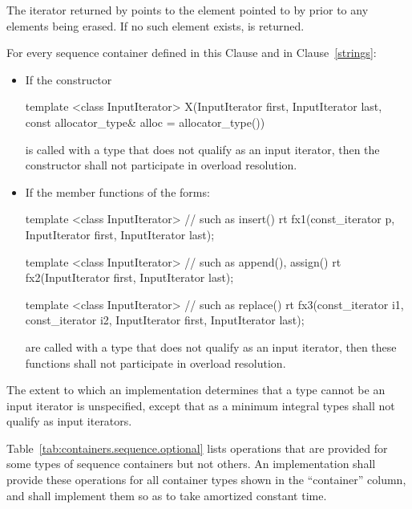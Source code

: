 \pnum
The iterator returned by
points to the element pointed to by
prior to any elements being erased.
If no such element exists,
is returned.

\pnum
For every sequence container defined in this Clause and in Clause~\ref{strings}:

\begin{itemize}
\item If the constructor

\begin{codeblock}
template <class InputIterator>
X(InputIterator first, InputIterator last,
  const allocator_type& alloc = allocator_type())
\end{codeblock}

is called with a type  that does not qualify as an input
iterator, then the constructor
shall not participate in overload resolution.

\item If the member functions of the forms:

\begin{codeblock}
template <class InputIterator>          // such as insert()
  rt fx1(const_iterator p, InputIterator first, InputIterator last);

template <class InputIterator>          // such as append(), assign()
  rt fx2(InputIterator first, InputIterator last);

template <class InputIterator>          // such as replace()
  rt fx3(const_iterator i1, const_iterator i2, InputIterator first, InputIterator last);
\end{codeblock}

are called with a type  that does not qualify as an input
iterator, then these functions
shall not participate in overload resolution.
\end{itemize}

\pnum
The extent to which an implementation determines that a type cannot be an input
iterator is unspecified, except that as a minimum integral types shall not qualify
as input iterators.

\pnum
Table~\ref{tab:containers.sequence.optional} lists operations
that are provided for some types of
sequence containers but not others.
An implementation shall provide
these operations for all container types shown in the ``container''
column, and shall implement them so as to take amortized constant
time.

